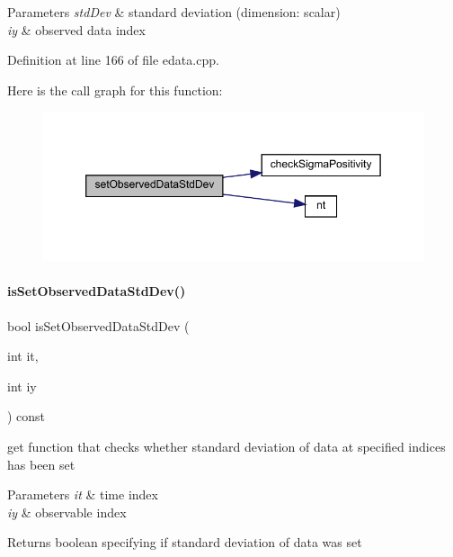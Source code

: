 \begin{DoxyParams}{Parameters}
{\em std\+Dev} & standard deviation (dimension\+: scalar) \\
\hline
{\em iy} & observed data index \\
\hline
\end{DoxyParams}


Definition at line 166 of file edata.\+cpp.

Here is the call graph for this function\+:
\nopagebreak
\begin{figure}[H]
\begin{center}
\leavevmode
\includegraphics[width=350pt]{classamici_1_1_exp_data_a10c64e99f5f3a2b19e3944b69b0d69ff_cgraph}
\end{center}
\end{figure}
\mbox{\label{classamici_1_1_exp_data_a75808a32f77afa60bb736a1dfbce9aba}} 
\paragraph{\texorpdfstring{is\+Set\+Observed\+Data\+Std\+Dev()}{isSetObservedDataStdDev()}}
{\footnotesize\ttfamily bool is\+Set\+Observed\+Data\+Std\+Dev (\begin{DoxyParamCaption}\item[{int}]{it,  }\item[{int}]{iy }\end{DoxyParamCaption}) const}

get function that checks whether standard deviation of data at specified indices has been set


\begin{DoxyParams}{Parameters}
{\em it} & time index \\
\hline
{\em iy} & observable index \\
\hline
\end{DoxyParams}
\begin{DoxyReturn}{Returns}
boolean specifying if standard deviation of data was set 
\end{DoxyReturn}


